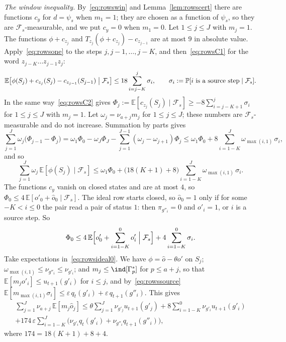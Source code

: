 \documentclass[11pt]{amsart}
\theoremstyle{definition}
\theoremstyle{remark}
\newcommand{\eps}{\varepsilon}
\newcommand{\PP}{\mathbb{P}}
\newcommand{\EE}{\mathbb{E}}
\newcommand{\cF}{\mathcal{F}}
\begin{document}
\emph{The window inequality.} By~\eqref{eq:rowswin} and Lemma~\ref{lem:rowscert} there are
functions $c_y$ for $d=\psi_s$ when $m_1=1$; they are chosen as a function of $\psi_s$, so they
are $\cF_s$-measurable, and we put $c_y=0$ when $m_1=0$. Let $1\le j\le J$ with $m_j=1$. The functions $\phi+c_{z_j}$ and
$T_{z_j}(\phi+c_{z_j})-c_{z_{j-1}}$ are at most $9$ in absolute value. Apply~\eqref{eq:rowsone}
to the steps $j,j-1,\dots,j-K$, and then~\eqref{eq:rowsC1} for the word $z_{j-K}\dots z_{j-1}z_j$:
\[
\EE\bigl[\phi(S_j)+c_{z_j}(S_j)-c_{z_{j-1}}(S_{j-1})\bigm|\cF_s\bigr]\le18\sum_{i=j-K}^{j}\sigma_i,
\qquad\sigma_i:=\PP[i\text{ is a source step}\mid\cF_s].
\]
In the same way~\eqref{eq:rowsC2} gives
$\Phi_j:=\EE[c_{z_j}(S_j)\mid\cF_s]\ge-8\sum_{i=j-K+1}^{j}\sigma_i$ for $1\le j\le J$ with
$m_j=1$. Let $\omega_j=\nu_{a+j}m_j$ for $1\le j\le J$; these numbers are $\cF_s$-measurable and
do not increase. Summation by parts gives
\[
\sum_{j=1}^{J}\omega_j\bigl(\Phi_{j-1}-\Phi_j\bigr)=\omega_1\Phi_0-\omega_J\Phi_J-\sum_{j=1}^{J-1}(\omega_j-\omega_{j+1})\Phi_j
\le\omega_1\Phi_0+8\sum_{i=1-K}^{J}\omega_{\max(i,1)}\,\sigma_i ,
\]
and so
\begin{equation}\label{eq:rowsideal0}
\sum_{j=1}^{J}\omega_j\,\EE[\phi(S_j)\mid\cF_s]\le\omega_1\Phi_0+\bigl(18(K+1)+8\bigr)\sum_{i=1-K}^{J}\omega_{\max(i,1)}\,\sigma_i .
\end{equation}
The functions $c_y$ vanish on closed states and are at most $4$, so
$\Phi_0\le4\,\EE[o'_0+\hat o_0\mid\cF_s]$. The ideal row starts closed, so $\hat o_0=1$ only if for
some $-K<i\le0$ the pair read a pair of status $1$: then $\pi_{g''_i}=0$ and $o'_i=1$, or $i$ is
a source step. So
\[
\Phi_0\le4\,\EE\Bigl[o'_0+\sum_{i=1-K}^{0}o'_i\Bigm|\cF_s\Bigr]+4\sum_{i=1-K}^{0}\sigma_i .
\]
Take expectations in~\eqref{eq:rowsideal0}. We have $\phi=\hat o-\theta o'$ on $S_j$;
$\omega_{\max(i,1)}\le\nu_{g''_i}\le\nu_{g'_i}$; and $m_j\le\ind[\Gamma^*_p]$ for $p\le a+j$, so
that $\EE[m_jo'_i]\le u_{t+1}(g'_i)$ for $i\le j$, and by~\eqref{eq:rowssource}
$\EE[m_{\max(i,1)}\sigma_i]\le\eps\,q_t(g'_i)+\eps\,q_{t+1}(g''_i)$. This gives
\begin{multline}\label{eq:rowsideal}
\sum_{j=1}^{J}\nu_{a+j}\,\EE[m_j\hat o_j]\le\theta\sum_{j=1}^{J}\nu_{g'_j}u_{t+1}(g'_j)
+8\sum_{i=1-K}^{0}\nu_{g'_i}u_{t+1}(g'_i)\\
+174\,\eps\sum_{i=1-K}^{J}\bigl(\nu_{g'_i}q_t(g'_i)+\nu_{g''_i}q_{t+1}(g''_i)\bigr),
\end{multline}
where $174=18(K+1)+8+4$.
\end{document}
